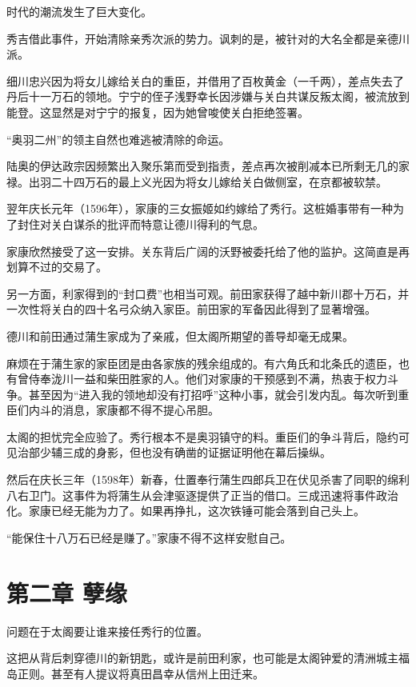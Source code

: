\documentclass[
]{article}
\begin{document}
时代的潮流发生了巨大变化。

秀吉借此事件，开始清除亲秀次派的势力。讽刺的是，被针对的大名全都是亲德川派。

细川忠兴因为将女儿嫁给关白的重臣，并借用了百枚黄金（一千两），差点失去了丹后十一万石的领地。宁宁的侄子浅野幸长因涉嫌与关白共谋反叛太阁，被流放到能登。这显然是对宁宁的报复，因为她曾唆使关白拒绝签署。

``奥羽二州''的领主自然也难逃被清除的命运。

陆奥的伊达政宗因频繁出入聚乐第而受到指责，差点再次被削减本已所剩无几的家禄。出羽二十四万石的最上义光因为将女儿嫁给关白做侧室，在京都被软禁。

翌年庆长元年（1596年），家康的三女振姬如约嫁给了秀行。这桩婚事带有一种为了封住对关白谋杀的批评而特意让德川得利的气息。

家康欣然接受了这一安排。关东背后广阔的沃野被委托给了他的监护。这简直是再划算不过的交易了。

另一方面，利家得到的``封口费''也相当可观。前田家获得了越中新川郡十万石，并一次性将关白的四十名弓众纳入家臣。前田家的军备因此得到了显著增强。

德川和前田通过蒲生家成为了亲戚，但太阁所期望的善导却毫无成果。

麻烦在于蒲生家的家臣团是由各家族的残余组成的。有六角氏和北条氏的遗臣，也有曾侍奉泷川一益和柴田胜家的人。他们对家康的干预感到不满，热衷于权力斗争。甚至因为``进入我的领地却没有打招呼''这种小事，就会引发内乱。每次听到重臣们内斗的消息，家康都不得不提心吊胆。

太阁的担忧完全应验了。秀行根本不是奥羽镇守的料。重臣们的争斗背后，隐约可见治部少辅三成的身影，但也没有确凿的证据证明他在幕后操纵。

然后在庆长三年（1598年）新春，仕置奉行蒲生四郎兵卫在伏见杀害了同职的绵利八右卫门。这事件为将蒲生从会津驱逐提供了正当的借口。三成迅速将事件政治化。家康已经无能为力了。如果再挣扎，这次铁锤可能会落到自己头上。

``能保住十八万石已经是赚了。''家康不得不这样安慰自己。

\section*{第二章 孽缘}\label{ux7b2cux4e8cux7ae0-ux5b7dux7f18}

问题在于太阁要让谁来接任秀行的位置。

这把从背后刺穿德川的新钥匙，或许是前田利家，也可能是太阁钟爱的清洲城主福岛正则。甚至有人提议将真田昌幸从信州上田迁来。
\end{document}
